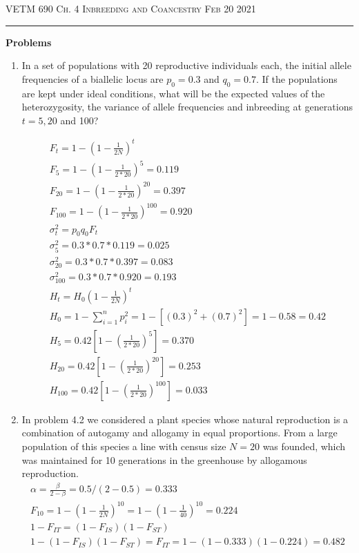 \documentclass[12pt]{amsart}
\begin{document}
\thispagestyle{empty}

{\scshape VETM 690} \hfill {\scshape \Large  Ch. 4 Inbreeding and Coancestry} \hfill {\scshape Feb 20 2021}
 
\medskip

\hrule

\bigskip

\bigskip

{\large \bf Problems}   
\begin{enumerate}
\item In a set of populations with 20 reproductive individuals each, the initial allele frequencies of a biallelic locus are $p_0 = 0.3$ and $q_0 = 0.7$. If the populations are kept under ideal conditions, what will be the expected values of the heterozygosity, the variance of allele frequencies and inbreeding at generations $t = 5, 20$ and 100?

\begin{gather*}
F_t = 1 - (1 - \frac{1}{2N})^t \\
F_5 = 1 - (1 - \frac{1}{2*20}) ^ 5 =  0.119\\
F_{20} = 1 - (1 - \frac{1}{2*20}) ^ {20} = 0.397\\  
F_{100} = 1 - (1 - \frac{1}{2*20}) ^ {100} = 0.920\\
\sigma _t^2 = p_0q_0F_t \\
\sigma_5^2 = 0.3 * 0.7 * 0.119 = 0.025\\
\sigma_{20}^2 = 0.3 * 0.7 * 0.397 = 0.083\\
\sigma_{100}^2 = 0.3 * 0.7 * 0.920 = 0.193\\
H_t = H_0(1 - \frac{1}{2N})^t \\
H_0 = 1 - \sum_{i=1}^np_i^2 = 1 - [(0.3)^2 + (0.7)^2] = 1 - 0.58 = 0.42 \\
H_5 = 0.42[1 - (\frac{1}{2*20})^5] = 0.370\\
H_{20} = 0.42[1 - (\frac{1}{2*20})^{20}] = 0.253\\
H_{100} = 0.42[1 - (\frac{1}{2*20})^{100}] = 0.033
\end{gather*}

\item In problem 4.2 we considered a plant species whose natural reproduction is a combination of autogamy and allogamy in equal proportions. From a large population of this species a line with census size $N = 20$ was founded, which was maintained for 10 generations in the greenhouse by allogamous reproduction. 
\begin{gather*}
\alpha = \frac{\beta}{2-\beta} = 0.5/(2 - 0.5) = 0.333 \\
F_{10} = 1 - (1 - \frac{1}{2N})^{10} = 1 - (1 - \frac{1}{40})^{10} = 0.224 \\
1 - F_{IT} = (1 - F_{IS})(1-F_{ST}) \\
1 - (1 - F_{IS})(1 - F_{ST}) = F_{IT} = 1 - (1 - 0.333)(1 - 0.224) = 0.482
\end{gather*}


\end{enumerate}
\end{document}
